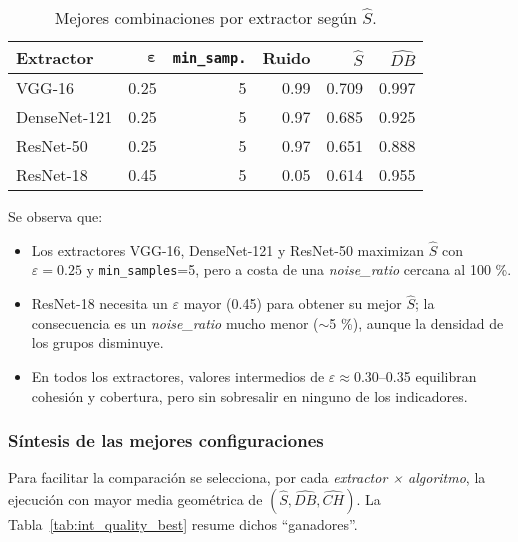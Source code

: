 \begin{table}[ht]
  \centering
  \caption{Mejores combinaciones por extractor según \(\widehat S\).}
  \label{tab:int_quality_dbscan_top}
  \begin{tabular}{lrrrrr}
    \hline
    \textbf{Extractor} & \(\boldsymbol{\varepsilon}\) &
    \texttt{min\_samp.} & \textbf{Ruido} &
    \(\widehat S\) & \(\widehat{DB}\) \\
    \hline
    VGG-16        & 0.25 & 5 & 0.99 & 0.709 & 0.997 \\
    DenseNet-121  & 0.25 & 5 & 0.97 & 0.685 & 0.925 \\
    ResNet-50     & 0.25 & 5 & 0.97 & 0.651 & 0.888 \\
    ResNet-18     & 0.45 & 5 & 0.05 & 0.614 & 0.955 \\
    \hline
  \end{tabular}
\end{table}

Se observa que:

\begin{itemize}
  \item Los extractores VGG-16, DenseNet-121 y ResNet-50 maximizan
        \(\widehat S\) con \(\varepsilon=0.25\) y
        \texttt{min\_samples}=5, pero a costa de una
        \textit{noise\_ratio} cercana al 100 \%.
  \item ResNet-18 necesita un \(\varepsilon\) mayor (0.45) para obtener
        su mejor \(\widehat S\); la consecuencia es un
        \textit{noise\_ratio} mucho menor (\(\sim\)5 \%),
        aunque la densidad de los grupos disminuye.
  \item En todos los extractores, valores intermedios de
        \(\varepsilon\approx0.30\)–0.35 equilibran cohesión y cobertura,
        pero sin sobresalir en ninguno de los indicadores.
\end{itemize}

\subsubsection{Síntesis de las mejores configuraciones}

Para facilitar la comparación se selecciona, por cada
\textit{extractor × algoritmo}, la ejecución con mayor media geométrica de
\((\widehat S,\widehat{DB},\widehat{CH})\).
La Tabla~\ref{tab:int_quality_best} resume dichos “ganadores”.

